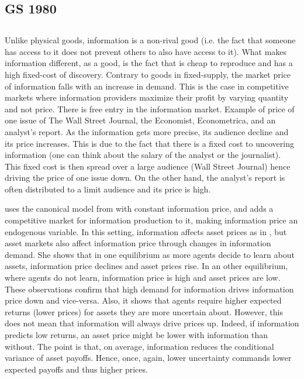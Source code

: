 \subsection{GS 1980}


\clearpage
\subsection{\textcite{Veldkamp2006}}
Unlike physical goods, information is a non-rival good (i.e. the fact that someone has access to it does not prevent others to also have access to it).
What makes information different, as a good, is the fact that is cheap to reproduce and has a high fixed-cost of discovery. 
Contrary to goods in fixed-supply, the market price of information falls with an increase in demand. This is the case in competitive markets where information providers maximize their profit by varying quantity and not price.
There is free entry in the information market.
Example of price of one issue of The Wall Street Journal, the Economist, Econometrica, and an analyst's report. As the information gets more precise, its audience decline and its price increases. This is due to the fact that there is a fixed cost to uncovering information (one can think about the salary of the analyst or the journalist). This fixed cost is then spread over a large audience (Wall Street Journal) hence driving the price of one issue down. On the other hand, the analyst's report is often distributed to a limit audience and its price is high. 

\textcite{Veldkamp2006} uses the canonical model from \textcite{Grossman1980} with constant information price, and adds a competitive market for information production to it, making information price an endogenous variable. In this setting, information affects asset prices as in \textcite{Grossman1980}, but asset markets also affect information price through changes in information demand. She shows that in one equilibrium as more agents decide to learn about assets, information price declines and asset prices rise. In an other equilibrium, where agents do not learn, information price is high and asset prices are low. These observations confirm that high demand for information drives information price down and vice-versa. Also, it shows that agents require higher expected returns (lower prices) for assets they are more uncertain about. However, this does not mean that information will always drive prices up. Indeed, if information predicts low returns, an asset price might be lower with information than without. The point is that, on average, information reduces the conditional variance of asset payoffs. Hence, once, again, lower uncertainty commands lower expected payoffs and thus higher prices.

